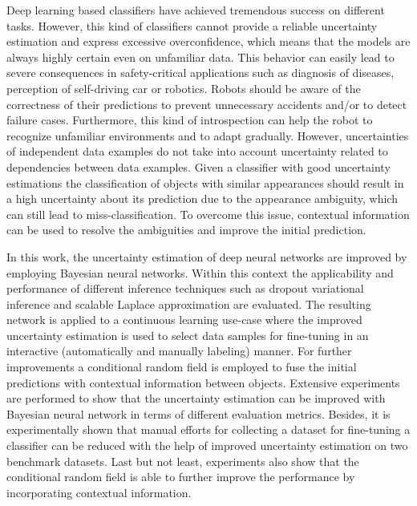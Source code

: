 Deep learning based classifiers have achieved tremendous success on different tasks. 
However, this kind of classifiers cannot provide a reliable uncertainty estimation and express excessive overconfidence, which means that the models are always highly certain even on unfamiliar data.
This behavior can easily lead to severe consequences in safety-critical applications such as diagnosis of diseases, perception of self-driving car or robotics. 
Robots should be aware of the correctness of their predictions to prevent unnecessary accidents and/or to detect failure cases.
Furthermore, this kind of introspection can help the robot to recognize unfamiliar environments and to adapt gradually.
However, uncertainties of independent data examples do not take into account uncertainty related to dependencies between data examples.
Given a classifier with good uncertainty estimations the classification of objects with similar appearances should result in a high uncertainty about its prediction due to the appearance ambiguity, which can still lead to miss-classification. To overcome this issue, contextual information can be used to resolve the ambiguities and improve the initial prediction.

In this work, the uncertainty estimation of deep neural networks are improved by employing Bayesian neural networks. 
Within this context the applicability and performance of different inference techniques such as dropout variational inference and scalable Laplace approximation are evaluated.
The resulting network is applied to a continuous learning use-case where the improved uncertainty estimation is used to select data samples for fine-tuning in an interactive (automatically and manually labeling) manner.
For further improvements a conditional random field is employed to fuse the initial predictions with contextual information between objects.
Extensive experiments are performed to show that the uncertainty estimation can be improved with Bayesian neural network in terms of different evaluation metrics.
Besides, it is experimentally shown that manual efforts for collecting a dataset for fine-tuning a classifier can be reduced with the help of improved uncertainty estimation on two benchmark datasets. 
Last but not least, experiments also show that the conditional random field is able to further improve the performance by incorporating contextual information.

\switchlanguage{\lang} %
